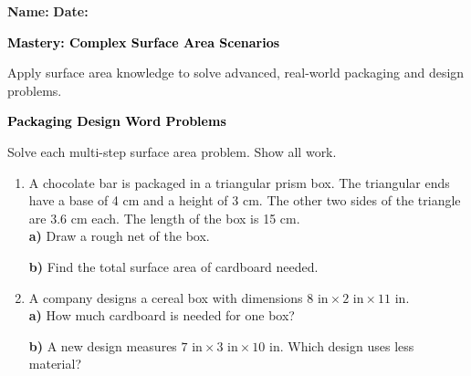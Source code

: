 \documentclass[12pt, letterpaper, fleqn]{article}
\newcommand{\blanklong}{\underline{\hspace{6.5cm}}}
\begin{document}
\textbf{Name:} \underline{\hspace{5cm}}
\hfill
\textbf{Date:} \underline{\hspace{3cm}}\\

\begin{tcolorbox}[colback=black!10]
    \large\textcolor{black}{\textbf{Mastery: Complex Surface Area Scenarios}}
\end{tcolorbox}

\vspace{3mm}

\noindent
Apply surface area knowledge to solve advanced, real-world packaging and design problems.

\vspace{4mm}

\begin{tcolorbox}[colback=black!10]
\large\textcolor{black}{\textbf{Packaging Design Word Problems}}
\end{tcolorbox}

\noindent
Solve each multi-step surface area problem. Show all work.

\vspace{3mm}

\begin{enumerate}[itemsep=0.5cm, leftmargin=0.6cm]

\item A chocolate bar is packaged in a triangular prism box. The triangular ends have a base of 4 cm and a height of 3 cm. The other two sides of the triangle are 3.6 cm each. The length of the box is 15 cm.\\
\textbf{a)} Draw a rough net of the box.\\

\vspace{2.5cm}

\textbf{b)} Find the total surface area of cardboard needed. \blanklong

\vspace{0.5cm}

\item A company designs a cereal box with dimensions $8\text{ in} \times 2\text{ in} \times 11\text{ in}$.\\
\textbf{a)} How much cardboard is needed for one box? \\
\vspace{2cm}

\textbf{b)} A new design measures $7\text{ in} \times 3\text{ in} \times 10\text{ in}$. Which design uses less material? \

\vspace{1.5cm}

\end{enumerate}
\end{document}
